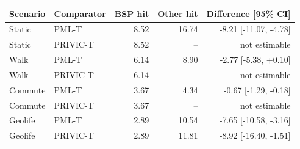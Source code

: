 \begin{tabular}{llrrr}
\toprule
Scenario & Comparator & BSP hit & Other hit & Difference [95\% CI] \\
\midrule
Static & PML-T & 8.52 & 16.74 & -8.21 [-11.07, -4.78] \\
Static & PRIVIC-T & 8.52 & -- & not estimable \\
Walk & PML-T & 6.14 & 8.90 & -2.77 [-5.38, +0.10] \\
Walk & PRIVIC-T & 6.14 & -- & not estimable \\
Commute & PML-T & 3.67 & 4.34 & -0.67 [-1.29, -0.18] \\
Commute & PRIVIC-T & 3.67 & -- & not estimable \\
Geolife & PML-T & 2.89 & 10.54 & -7.65 [-10.58, -3.16] \\
Geolife & PRIVIC-T & 2.89 & 11.81 & -8.92 [-16.40, -1.51] \\
\bottomrule
\end{tabular}